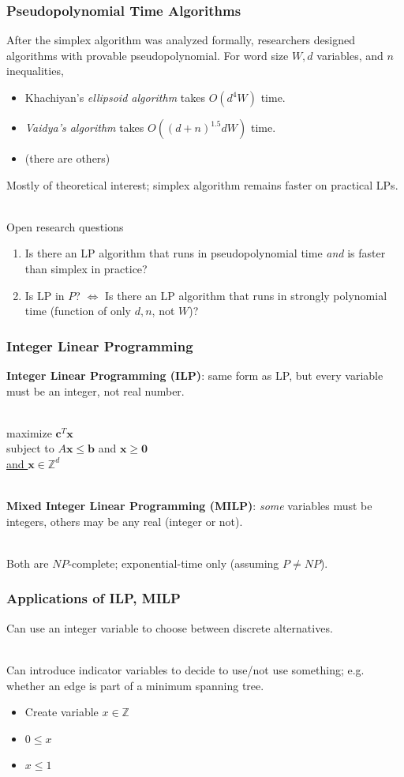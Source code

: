 \documentclass{beamer}
\newcommand{\stanza}{ \\~\ }
\begin{document}
\begin{frame} \frametitle{Pseudopolynomial Time Algorithms}
After the simplex algorithm was analyzed formally, researchers designed algorithms with provable pseudopolynomial. For word size $W, d$ variables, and $n$ inequalities,
\begin{itemize}
  \item Khachiyan's \emph{ellipsoid algorithm} takes $O(d^4 W)$ time.
  \item \emph{Vaidya's algorithm} takes $O((d+n)^{1.5} d W)$ time.
  \item (there are others)
\end{itemize}

Mostly of theoretical interest; simplex algorithm remains faster on practical LPs. \stanza

Open research questions
\begin{enumerate}
  \item Is there an LP algorithm that runs in pseudopolynomial time \emph{and} is faster than simplex in practice?
  \item Is LP in $P$? $\Leftrightarrow$ Is there an LP algorithm that runs in strongly polynomial time (function of only $d, n$, not $W$)?
\end{enumerate}
\end{frame}

\begin{frame} \frametitle{Integer Linear Programming}
\textbf{Integer Linear Programming (ILP)}: same form as LP, but every variable must
be an integer, not real number. \stanza

maximize $\mathbf{c}^T \mathbf{x}$ \\
subject to $A \mathbf{x} \leq \mathbf{b}$ and $\mathbf{x} \geq \mathbf{0}$ \\
\underline{and $\mathbf{x} \in \mathbb{Z}^d$} \stanza

\textbf{Mixed Integer Linear Programming (MILP)}: \emph{some} variables must be
integers, others may be any real (integer or not). \stanza

Both are $NP$-complete; exponential-time only (assuming $P \ne NP$).
\end{frame}

\begin{frame} \frametitle{Applications of ILP, MILP}
Can use an integer variable to choose between discrete alternatives. \stanza

Can introduce indicator variables to decide to use/not use something; e.g.
whether an edge is part of a minimum spanning tree.
\begin{itemize}
  \item Create variable $x \in \mathbb{Z}$
  \item $0 \leq x$
  \item $x \leq 1$
\end{itemize}
\end{frame}
\end{document}
